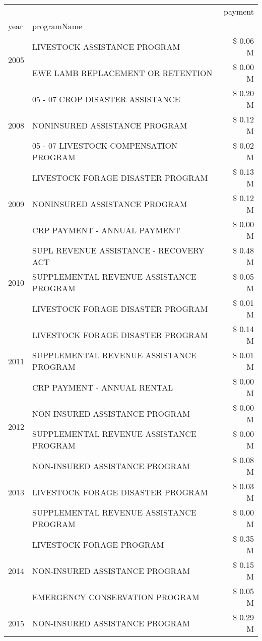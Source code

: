 \begin{tabular}{llr}
\toprule
 &  & payment \\
year & programName &  \\
\midrule
\multirow[t]{2}{*}{2005} & LIVESTOCK ASSISTANCE PROGRAM & \$ 0.06 M \\
 & EWE LAMB REPLACEMENT OR RETENTION & \$ 0.00 M \\
\cline{1-3}
\multirow[t]{3}{*}{2008} & 05 - 07 CROP DISASTER ASSISTANCE & \$ 0.20 M \\
 & NONINSURED ASSISTANCE PROGRAM & \$ 0.12 M \\
 & 05 - 07 LIVESTOCK COMPENSATION PROGRAM & \$ 0.02 M \\
\cline{1-3}
\multirow[t]{3}{*}{2009} & LIVESTOCK FORAGE DISASTER  PROGRAM & \$ 0.13 M \\
 & NONINSURED ASSISTANCE PROGRAM & \$ 0.12 M \\
 & CRP PAYMENT - ANNUAL PAYMENT & \$ 0.00 M \\
\cline{1-3}
\multirow[t]{3}{*}{2010} & SUPL REVENUE ASSISTANCE - RECOVERY ACT & \$ 0.48 M \\
 & SUPPLEMENTAL REVENUE ASSISTANCE PROGRAM & \$ 0.05 M \\
 & LIVESTOCK FORAGE DISASTER PROGRAM & \$ 0.01 M \\
\cline{1-3}
\multirow[t]{3}{*}{2011} & LIVESTOCK FORAGE DISASTER PROGRAM & \$ 0.14 M \\
 & SUPPLEMENTAL REVENUE ASSISTANCE PROGRAM & \$ 0.01 M \\
 & CRP PAYMENT - ANNUAL RENTAL & \$ 0.00 M \\
\cline{1-3}
\multirow[t]{2}{*}{2012} & NON-INSURED ASSISTANCE PROGRAM & \$ 0.00 M \\
 & SUPPLEMENTAL REVENUE ASSISTANCE PROGRAM & \$ 0.00 M \\
\cline{1-3}
\multirow[t]{3}{*}{2013} & NON-INSURED ASSISTANCE PROGRAM & \$ 0.08 M \\
 & LIVESTOCK FORAGE DISASTER PROGRAM & \$ 0.03 M \\
 & SUPPLEMENTAL REVENUE ASSISTANCE PROGRAM & \$ 0.00 M \\
\cline{1-3}
\multirow[t]{3}{*}{2014} & LIVESTOCK FORAGE PROGRAM & \$ 0.35 M \\
 & NON-INSURED ASSISTANCE PROGRAM & \$ 0.15 M \\
 & EMERGENCY CONSERVATION PROGRAM & \$ 0.05 M \\
\cline{1-3}
\multirow[t]{3}{*}{2015} & NON-INSURED ASSISTANCE PROGRAM & \$ 0.29 M \\

\end{tabular}
